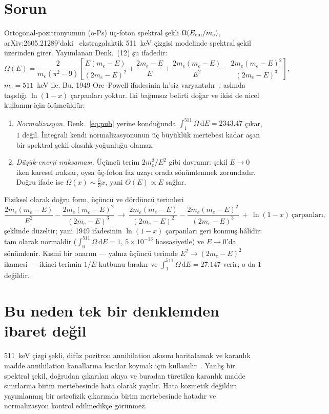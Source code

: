 \documentclass[11pt,a4paper]{article}
\begin{document}
\section{Sorun}
Ortogonal-pozitronyumun (o-Ps) üç-foton spektral şekli
$\Omega(E_{\rm em}/m_e)$, arXiv:2605.21289'daki~\cite{sy26} ekstragalaktik
511~keV çizgisi modelinde spektral şekil üzerinden girer. Yayımlanan
Denk.~(12) şu ifadedir:
\begin{equation}
\label{eq:pub}
\Omega(E) = \frac{2}{m_e(\pi^2-9)}\left[
\frac{E(m_e-E)}{(2m_e-E)^2} + \frac{2m_e-E}{E}
+ \frac{2m_e(m_e-E)}{E^2} - \frac{2m_e(m_e-E)^2}{(2m_e-E)^3}\right],
\end{equation}
$m_e = 511$~keV ile. Bu, 1949 Ore--Powell ifadesinin ln'siz
varyantıdır~\cite{ore49}: aslında taşıdığı $\ln(1-x)$ çarpanları
yoktur. İki bağımsız belirti doğar ve ikisi de nicel kullanım için
ölümcüldür:
\begin{enumerate}
    \item \emph{Normalizasyon.} Denk.~\eqref{eq:pub} yerine konduğunda
    $\int_{1}^{511}\Omega\,\mathrm{d}E = 2343.47$ çıkar, $1$ değil.
    İntegrali kendi normalizasyonunun üç büyüklük mertebesi kadar
    aşan bir spektral şekil olasılık yoğunluğu olamaz.
    \item \emph{Düşük-enerji ıraksaması.} Üçüncü terim $2m_e^2/E^2$
    gibi davranır: şekil $E\to 0$ iken karesel ıraksar, oysa üç-foton
    faz uzayı orada sönümlenmek zorundadır. Doğru ifade ise
    $\Omega(x)\sim\tfrac{5}{3}x$, yani $O(E)\propto E$ sağlar.
\end{enumerate}
Fiziksel olarak doğru form, üçüncü ve dördüncü terimleri
\begin{equation}
\label{eq:corr}
\frac{2m_e(m_e-E)}{E^2} - \frac{2m_e(m_e-E)^2}{(2m_e-E)^3}
\ \longrightarrow\
\frac{2m_e(m_e-E)}{(2m_e-E)^2} - \frac{2m_e(m_e-E)^2}{(2m_e-E)^3}
\ +\ \ln(1-x)\ \text{çarpanları},
\end{equation}
şeklinde düzeltir; yani 1949 ifadesinin $\ln(1-x)$ çarpanları geri
konmuş hâlidir: tam olarak normaldir
($\int_0^{511}\Omega\,\mathrm{d}E = 1$, $5\times10^{-13}$ hassasiyetle)
ve $E\to 0$'da sönümlenir. Kısmi bir onarım --- yalnız üçüncü
terimde $E^2 \to (2m_e-E)^2$ ikamesi --- ikinci terimin $1/E$ kutbunu
bırakır ve $\int_{1}^{511}\Omega\,\mathrm{d}E = 27.147$ verir; o da $1$
değildir.

\section{Bu neden tek bir denklemden ibaret değil}
511~keV çizgi şekli, difüz pozitron annihilation akısını haritalamak ve
karanlık madde annihilation kanallarına kısıtlar koymak için
kullanılır~\cite{sy26,yoneda25}. Yanlış bir spektral şekil, doğrudan
çıkarılan akıya ve buradan türetilen karanlık madde sınırlarına birim
mertebesinde hata olarak yayılır. Hata kozmetik değildir: yayımlanmış bir
astrofizik çıkarımda birim mertebesinde hatadır ve normalizasyon
kontrol edilmedikçe görünmez.
\end{document}
